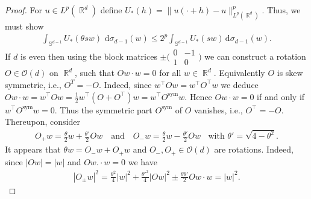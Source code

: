 \documentclass[12pt, reqno]{amsart}%
\theoremstyle{plain}  %
\theoremstyle{definition}  %
\theoremstyle{remark}
\numberwithin{equation}{section}
\DeclareMathOperator{\R}{\mathbb{R}}
\renewcommand{\d}{\,\mathrm{d}}
\begin{document}
\begin{proof}
For $u\in L^p(\R^d)$ define $U_*(h) = \|u(\cdot+h)-u\|^p_{L^p(\R^d)}$. 
Thus, we must show 
\begin{align*}
\int_{\mathbb{S}^{d-1}} U_*(\theta sw)\,\d \sigma_{d-1}(w)\leq 2^{p} \int_{\mathbb{S}^{d-1}} U_*(sw)\d \sigma_{d-1}(w).
\end{align*}
\noindent If $d$ is even then using the block matrices
$\pm\big(\begin{smallmatrix}
0&-1\\1&0
\end{smallmatrix}\big)$ we can  construct a rotation $O\in \mathcal{O}(d)$ on $\R^d$,  such that $Ow \cdot w= 0$ for all $w\in \R^d$. Equivalently $O$ is skew symmetric, i.e., $O^T=-O$.  Indeed, since $ w^\top Ow =w^\top O^\top w$ we deduce $Ow\cdot w= w^\top  O w = \frac{1}{2} w^\top  (O + O^\top ) w= w^\top O^{\operatorname{sym}}w$.
Hence $Ow\cdot w=0$ if and only if $w^\top O^{\operatorname{sym}} w=0$. Thus the symmetric part  $O^{\operatorname{sym}} $ of $O$ vanishes, i.e., $O^\top =-O$. Thereupon, consider
\begin{align*}
	O_+ w = \frac{\theta}{2} w+ \frac{\theta'}{2} Ow\quad\text{and}\quad O_- w = \frac{\theta}{2} w- \frac{\theta'}{2}Ow\;\;\text{ with  $\theta' = \sqrt{4-\theta^2}$}.
\end{align*}
It appears that  $\theta w= O_-w+O_+w$ and  $O_-,O_+ \in \mathcal{O}(d)$ are rotations. Indeed,  since
$|Ow|= |w|$ and $Ow.\cdot w=0$ we have
\begin{align*}
| O_\pm w |^2= \frac{\theta^2}{4}|w|^2+ \frac{\theta'^2}{4}|Ow|^2 \pm \frac{\theta\theta'}{2}O w\cdot w= |w|^2.
\end{align*}


\end{proof}
\end{document}
